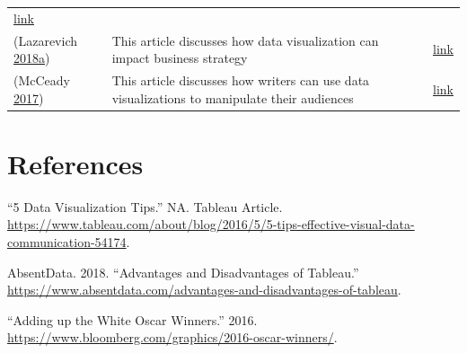 \documentclass[]{book}
\theoremstyle{definition}
\theoremstyle{definition}
\theoremstyle{definition}
\theoremstyle{remark}
\begin{document}
\begin{longtable}[]{@{}lll@{}}
\begin{minipage}[t]{0.48\columnwidth}
\href{https://www.forbes.com/sites/bernardmarr/2017/07/20/the-7-best-data-visualization-tools-in-2017/\#3a12b8ea6c30}{link}\strut
\end{minipage}\tabularnewline
\begin{minipage}[t]{0.15\columnwidth}\raggedright\strut
(Lazarevich
\protect\hyperlink{ref-strategy_impact}{2018}\protect\hyperlink{ref-strategy_impact}{a})\strut
\end{minipage} & \begin{minipage}[t]{0.28\columnwidth}\raggedright\strut
This article discusses how data visualization can impact business
strategy\strut
\end{minipage} & \begin{minipage}[t]{0.48\columnwidth}\raggedright\strut
\href{https://www.iotforall.com/data-visualization-strategy-for-business/}{link}\strut
\end{minipage}\tabularnewline
\begin{minipage}[t]{0.15\columnwidth}\raggedright\strut
(McCeady \protect\hyperlink{ref-writers_manipulate}{2017})\strut
\end{minipage} & \begin{minipage}[t]{0.28\columnwidth}\raggedright\strut
This article discusses how writers can use data visualizations to
manipulate their audiences\strut
\end{minipage} & \begin{minipage}[t]{0.48\columnwidth}\raggedright\strut
\href{https://venngage.com/blog/misleading-graphs/}{link}\strut
\end{minipage}\tabularnewline
\bottomrule
\end{longtable}

\chapter*{References}\label{references-1}

\hypertarget{refs}{}
\hypertarget{ref-DataVizTips}{}
``5 Data Visualization Tips.'' NA. Tableau Article.
\url{https://www.tableau.com/about/blog/2016/5/5-tips-effective-visual-data-communication-54174}.

\hypertarget{ref-tableau_interactive_viz}{}
AbsentData. 2018. ``Advantages and Disadvantages of Tableau.''
\url{https://www.absentdata.com/advantages-and-disadvantages-of-tableau}.

\hypertarget{ref-adding_oscars}{}
``Adding up the White Oscar Winners.'' 2016.
\url{https://www.bloomberg.com/graphics/2016-oscar-winners/}.
\end{document}
